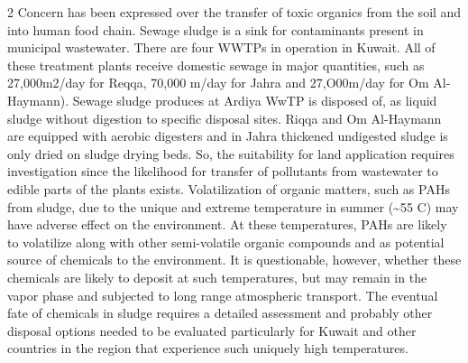 \documentclass{article}
\begin{document}
\begin{paracol}{2}
Concern has been expressed over the transfer of toxic
organics from the soil and into human food chain. Sewage
sludge is a sink for contaminants present in municipal
wastewater. There are four WWTPs in operation in Kuwait.
All of these treatment plants receive domestic sewage
in major quantities, such as 27,000m2/day for Reqqa,
70,000 m/day for Jahra and 27,O00m/day for Om Al-
Haymann). Sewage sludge produces at Ardiya WwTP is
disposed of, as liquid sludge without digestion to specific disposal sites. Riqqa and Om Al-Haymann are equipped with
aerobic digesters and in Jahra thickened undigested sludge
is only dried on sludge drying beds. So, the suitability for
land application requires investigation since the likelihood
for transfer of pollutants from wastewater to edible parts
of the plants exists. Volatilization of organic matters, such
as PAHs from sludge, due to the unique and extreme temperature in summer (\textasciitilde{}55 C) may have adverse effect on
the environment. At these temperatures, PAHs are likely to
volatilize along with other semi-volatile organic compounds
and as potential source of chemicals to the environment. It is
questionable, however, whether these chemicals are likely to
deposit at such temperatures, but may remain in the vapor
phase and subjected to long range atmospheric transport.
The eventual fate of chemicals in sludge requires a detailed
assessment and probably other disposal options needed to be
evaluated particularly for Kuwait and other countries in the
region that experience such uniquely high temperatures.

\switchcolumn
\RaggedRight


\end{paracol}
\end{document}
